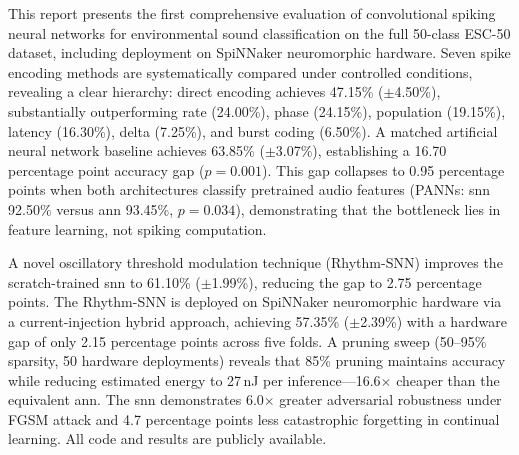 This report presents the first comprehensive evaluation of convolutional spiking neural networks for environmental sound classification on the full 50-class ESC-50 dataset, including deployment on SpiNNaker neuromorphic hardware.
Seven spike encoding methods are systematically compared under controlled conditions, revealing a clear hierarchy: direct encoding achieves 47.15\% ($\pm$4.50\%), substantially outperforming rate (24.00\%), phase (24.15\%), population (19.15\%), latency (16.30\%), delta (7.25\%), and burst coding (6.50\%).
A matched artificial neural network baseline achieves 63.85\% ($\pm$3.07\%), establishing a 16.70 percentage point accuracy gap ($p = 0.001$).
This gap collapses to 0.95 percentage points when both architectures classify pretrained audio features (PANNs: \gls{snn} 92.50\% versus \gls{ann} 93.45\%, $p = 0.034$), demonstrating that the bottleneck lies in feature learning, not spiking computation.

A novel oscillatory threshold modulation technique (Rhythm-SNN) improves the scratch-trained \gls{snn} to 61.10\% ($\pm$1.99\%), reducing the gap to 2.75 percentage points.
The Rhythm-SNN is deployed on SpiNNaker neuromorphic hardware via a current-injection hybrid approach, achieving 57.35\% ($\pm$2.39\%) with a hardware gap of only 2.15 percentage points across five folds.
A pruning sweep (50--95\% sparsity, 50 hardware deployments) reveals that 85\% pruning maintains accuracy while reducing estimated energy to 27\,nJ per inference---16.6$\times$ cheaper than the equivalent \gls{ann}.
The \gls{snn} demonstrates 6.0$\times$ greater adversarial robustness under FGSM attack and 4.7 percentage points less catastrophic forgetting in continual learning.
All code and results are publicly available.
